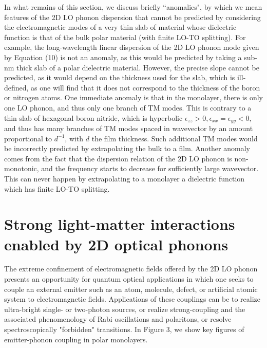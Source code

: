 \documentclass[aps,prb,twocolumn,
	groupedaddress,superscriptaddress,
	amsfonts,amssymb,amsmath,floatfix,
	citeautoscript]{revtex4-1}
\begin{document}
In what remains of this section, we discuss briefly ``anomalies", by which we mean features of the 2D LO phonon dispersion that cannot be predicted by considering the electromagnetic modes of a very thin slab of material whose dielectric function is that of the bulk polar material (with finite LO-TO splitting). For example, the long-wavelength linear dispersion of the 2D LO phonon mode given by Equation (10) is not an anomaly, as this would be predicted by taking a sub-nm thick slab of a polar dielectric material. However, the precise slope cannot be predicted, as it would depend on the thickness used for the slab, which is ill-defined, as one will find that it does not correspond to the thickness of the boron or nitrogen atoms. One immediate anomaly is that in the monolayer, there is only one LO phonon, and thus only one branch of TM modes. This is contrary to a thin slab of hexagonal boron nitride, which is hyperbolic $\epsilon_{zz} > 0, \epsilon_{xx} = \epsilon_{yy} < 0$, and thus has many branches of TM modes spaced in wavevector by an amount proportional to $d^{-1}$, with $d$ the film thickness. Such additional TM modes would be incorrectly predicted by extrapolating the bulk to a film. Another anomaly comes from the fact that the dispersion relation of the 2D LO phonon is non-monotonic, and the frequency starts to decrease for sufficiently large wavevector. This can never happen by extrapolating to a monolayer a dielectric function which has finite LO-TO splitting. 

\section{Strong light-matter interactions enabled by 2D optical phonons}

The extreme confinement of electromagnetic fields offered by the 2D LO phonon presents an opportunity for quantum optical applications in which one seeks to couple an external emitter such as an atom, molecule, defect, or artificial atomic system to electromagnetic fields. Applications of these couplings can be to realize ultra-bright single- or two-photon sources, or realize strong-coupling and the associated phenomenology of Rabi oscillations and polaritons, or resolve spectroscopically "forbidden" transitions. In Figure 3, we show key figures of emitter-phonon coupling in polar monolayers. 
\end{document}
